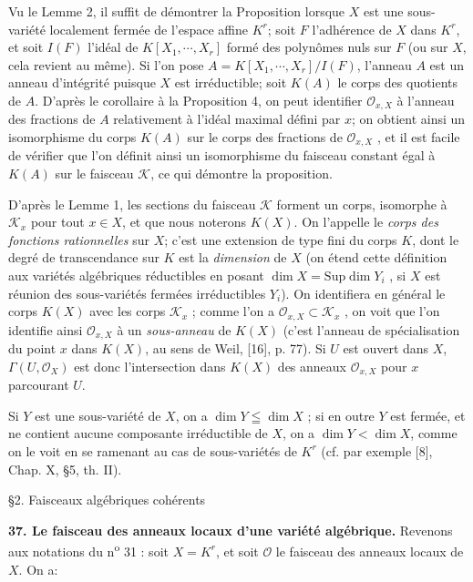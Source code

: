 Vu le Lemme 2, il suffit de démontrer la Proposition lorsque $X$ est une sous-variété localement fermée de l'espace affine $K^r$; soit $F$ l'adhérence de $X$ dans $K^r$, et soit $I(F)$ l'idéal de $K[X_1 , \cdots , X_r]$ formé des polynômes nuls sur $F$ (ou sur $X$, cela revient au même). Si l'on pose $A = K[X_1 , \cdots , X_r]/I(F)$, l'anneau $A$ est un anneau d'intégrité puisque $X$ est irréductible; soit $K(A)$ le corps des quotients de $A$. D'après le corollaire à la Proposition 4, on peut identifier $\mathcal{O}_{x,X}$
à l'anneau des fractions de $A$ relativement à l'idéal maximal défini par $x$; on obtient ainsi un isomorphisme du corps $K(A)$ sur le corps des fractions de $\mathcal{O}_{x,X}$ , et il est facile de vérifier que l'on définit ainsi un isomorphisme du faisceau constant égal à $K(A)$ sur le faisceau $\mathcal{K}$, ce qui démontre la proposition.

D'après le Lemme 1, les sections du faisceau $\mathcal{K}$ forment un corps, isomorphe à $\mathcal{K}_x$ pour tout $x \in X$, et que nous noterons $K(X)$. On l'appelle le \textit{corps des fonctions rationnelles} sur $X$; c'est une extension de type fini du corps $K$, dont le degré de transcendance sur $K$ est la \textit{dimension} de $X$ (on étend cette définition aux variétés algébriques réductibles en posant $\dim X = \mathrm{Sup} \dim Y_i$ , si $X$ est réunion des sous-variétés fermées irréductibles $Y_i$). On identifiera en général le corps $K(X)$ avec les corps $\mathcal{K}_x$ ; comme l'on a $\mathcal{O}_{x,X} \subset \mathcal{K}_x$ , on voit que l'on identifie ainsi $\mathcal{O}_{x,X}$ à un \textit{sous-anneau} de $K(X)$ (c'est l'anneau de spécialisation du point $x$ dans $K(X)$, au sens de Weil, [16], p. 77). Si $U$ est ouvert dans $X$, $\Gamma(U, \mathcal{O}_X)$ est donc l'intersection dans $K(X)$ des anneaux $\mathcal{O}_{x,X}$ pour $x$ parcourant $U$.

Si $Y$ est une sous-variété de $X$, on a $\dim Y \leqq \dim X$ ; si en outre $Y$ est fermée, et ne contient aucune composante irréductible de $X$, on a $\dim Y < \dim X$, comme on le voit en se ramenant au cas de sous-variétés de $K^r$ (cf. par exemple [8], Chap. X, \S5, th. II).


\S2. Faisceaux algébriques cohérents

\textbf{37. Le faisceau des anneaux locaux d'une variété algébrique.} Revenons aux notations du n\textsuperscript{o} 31 : soit $X = K^r$, et soit $\mathcal{O}$ le faisceau des anneaux locaux de $X$. On a:

